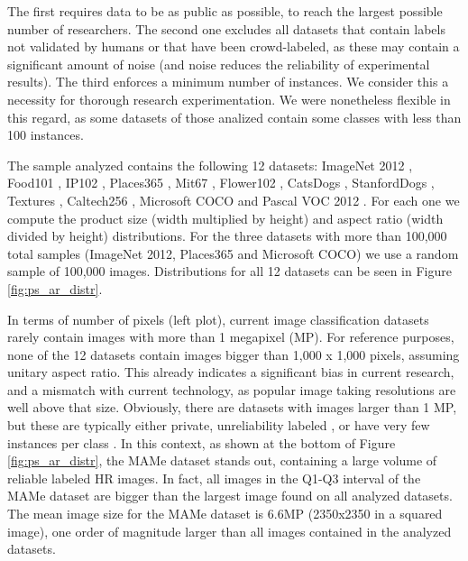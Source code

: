 \documentclass{article}
\begin{document}
The first requires data to be as public as possible, to reach the largest possible number of researchers. The second one excludes all datasets that contain labels not validated by humans or that have been crowd-labeled, as these may contain a significant amount of noise (and noise reduces the reliability of experimental results). The third enforces a minimum number of instances. We consider this a necessity for thorough research experimentation. We were nonetheless flexible in this regard, as some datasets of those analized contain some classes with less than 100 instances.

The sample analyzed contains the following 12 datasets: ImageNet 2012 \citep{russakovsky2015imagenet}, Food101 \citep{bossard2014food}, IP102 \citep{wu2019ip102}, Places365 \citep{zhou2017places}, Mit67 \citep{quattoni2009recognizing}, Flower102 \citep{nilsback2008automated}, CatsDogs \citep{parkhi2012cats}, StanfordDogs \citep{khosla2011novel}, Textures \citep{cimpoi2014describing}, Caltech256 \citep{griffin2007caltech}, Microsoft COCO \citep{lin2014microsoft} and Pascal VOC 2012 \citep{pascal-voc-2012}. 
For each one we compute the product size (\ie width multiplied by height) and aspect ratio (\ie width divided by height) distributions. For the three datasets with more than 100,000 total samples (ImageNet 2012, Places365 and Microsoft COCO) we use a random sample of 100,000 images. Distributions for all 12 datasets can be seen in Figure \ref{fig:ps_ar_distr}.

In terms of number of pixels (left plot), current image classification datasets rarely contain images with more than 1 megapixel (MP). For reference purposes, none of the 12 datasets contain images bigger than 1,000 x 1,000 pixels, assuming unitary aspect ratio. This already indicates a significant bias in current research, and a mismatch with current technology, as popular image taking resolutions are well above that size. Obviously, there are datasets with images larger than 1 MP, but these are typically either private, unreliability labeled \citep{OpenImages}, or have very few instances per class \citep{GoogleLandmarks}. In this context, as shown at the bottom of Figure \ref{fig:ps_ar_distr}, the MAMe dataset stands out, containing a large volume of reliable labeled HR images. In fact, all images in the Q1-Q3 interval of the MAMe dataset are bigger than the largest image found on all analyzed datasets. The mean image size for the MAMe dataset is 6.6MP (\eg 2350x2350 in a squared image), one order of magnitude larger than all images contained in the analyzed datasets.
\end{document}
